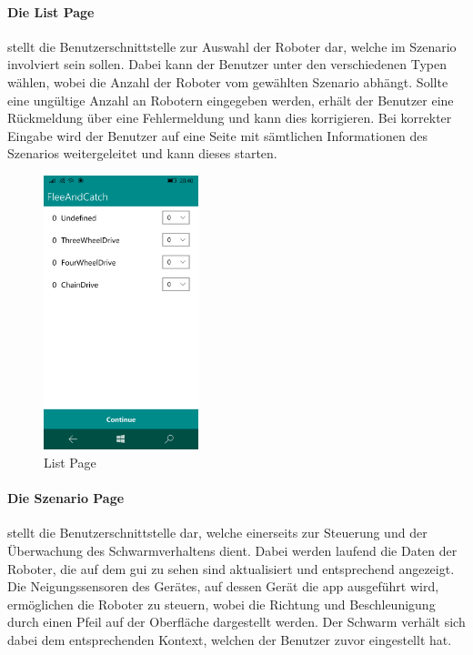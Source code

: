 \newpage
\paragraph{Die List Page} stellt die Benutzerschnittstelle zur Auswahl der Roboter dar, welche im Szenario involviert sein sollen. Dabei kann der Benutzer unter den verschiedenen Typen wählen, wobei die Anzahl der Roboter vom gewählten Szenario abhängt. Sollte eine ungültige Anzahl an Robotern eingegeben werden, erhält der Benutzer eine Rückmeldung über eine Fehlermeldung und kann dies korrigieren. Bei korrekter Eingabe wird der Benutzer auf eine Seite mit sämtlichen Informationen des Szenarios weitergeleitet und kann dieses starten.\\

\bigskip

\begin{figure}[h]
	\begin{center}
		\includegraphics[width=0.4\textwidth]{images/implementation/list.png}
	\end{center}	
	\caption{List Page}
	\label{fig:list}
\end{figure}

\newpage
\paragraph{Die Szenario Page} stellt die Benutzerschnittstelle dar, welche einerseits zur Steuerung und der Überwachung des Schwarmverhaltens dient. Dabei werden laufend die Daten der Roboter, die auf dem \gls{gui} zu sehen sind aktualisiert und entsprechend angezeigt. Die Neigungssensoren des Gerätes, auf dessen Gerät die \gls{app} ausgeführt wird, ermöglichen die Roboter zu steuern, wobei die Richtung und Beschleunigung durch einen Pfeil auf der Oberfläche dargestellt werden. Der Schwarm verhält sich dabei dem entsprechenden Kontext, welchen der Benutzer zuvor eingestellt hat.\\

